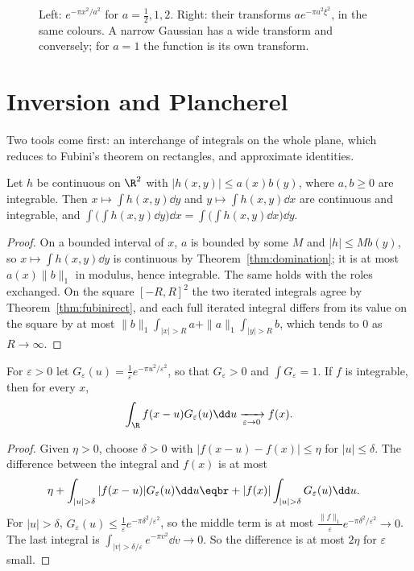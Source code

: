 \begin{figure}[ht]
\centering
{}
\caption{Left: $e^{-\pi x^2/a^2}$ for $a=\frac12,1,2$. Right: their transforms $ae^{-\pi a^2\xi^2}$, in the same colours. A narrow Gaussian has a wide
transform and conversely; for $a=1$ the function is its own transform.}
\label{fig:gaussians}
\end{figure}

\section{Inversion and Plancherel}

Two tools come first: an interchange of integrals on the whole plane, which reduces to Fubini's theorem on rectangles,
and approximate identities.

\begin{lemma}\label{lem:fubiniplane}
Let $h$ be continuous on $\R^2$ with $|h(x,y)|\le a(x)b(y)$, where $a,b\ge0$ are integrable. Then $x\mapsto\int h(x,y)\dd y$ and $y\mapsto\int h(x,y)\dd x$ are
continuous and integrable, and $\int\bigl(\int h(x,y)\dd y\bigr)\dd x=\int\bigl(\int h(x,y)\dd x\bigr)\dd y$.
\end{lemma}
\begin{proof}
On a bounded interval of $x$, $a$ is bounded by some $M$ and $|h|\le Mb(y)$, so $x\mapsto\int h(x,y)\dd y$ is continuous by Theorem~\ref{thm:domination}; it is at
most $a(x)\|b\|_1$ in modulus, hence integrable. The same holds with the roles exchanged. On the square $[-R,R]^2$ the two iterated
integrals agree by Theorem~\ref{thm:fubinirect}, and each full iterated integral differs from its value on the square by at most
$\|b\|_1\int_{|x|>R}a+\|a\|_1\int_{|y|>R}b$, which tends to $0$ as $R\to\infty$.
\end{proof}

\begin{lemma}\label{lem:approxid}
For $\varepsilon>0$ let $G_\varepsilon(u)=\frac1\varepsilon e^{-\pi u^2/\varepsilon^2}$, so that $G_\varepsilon>0$ and $\int G_\varepsilon=1$. If $f$ is integrable, then for every $x$,
\[
\int_{\R}f(x-u)G_\varepsilon(u)\dd u\xrightarrow[\varepsilon\to0]{}f(x).
\]
\end{lemma}
\begin{proof}
Given $\eta>0$, choose $\delta>0$ with $|f(x-u)-f(x)|\le\eta$ for $|u|\le\delta$. The difference between the integral and $f(x)$ is at most
\[
\begin{aligned}\eta&+\int_{|u|>\delta}|f(x-u)|G_\varepsilon(u)\dd u\eqbr+|f(x)|\int_{|u|>\delta}G_\varepsilon(u)\dd u.\end{aligned}
\]
For $|u|>\delta$, $G_\varepsilon(u)\le\frac1\varepsilon e^{-\pi\delta^2/\varepsilon^2}$, so the middle term is at most $\frac{\|f\|_1}\varepsilon e^{-\pi\delta^2/\varepsilon^2}\to0$. The last integral is
$\int_{|v|>\delta/\varepsilon}e^{-\pi v^2}\dd v\to0$. So the difference is at most $2\eta$ for $\varepsilon$ small.
\end{proof}

